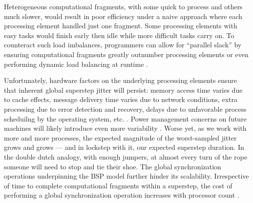 Heterogeneous computational fragments, with some quick to process and others much slower, would result in poor efficiency under a naive approach where each processing element handled just one fragment.
Some processing elements with easy tasks would finish early then idle while more difficult tasks carry on.
To counteract such load imbalances, programmers can allow for ``parallel slack'' by ensuring computational fragments greatly outnumber processing elements or even performing dynamic load balancing at runtime \citep{valiant1990bridging}.

Unfortunately, hardware factors on the underlying processing elements ensure that inherent global superstep jitter will persist: memory access time varies due to cache effects, message delivery time varies due to network conditions, extra processing due to error detection and recovery, delays due to unfavorable process scheduilng by the operating system, etc. \citep{dongarra2014applied}.
Power management concerns on future machines will likely introduce even more variability \citep{gropp2013programming}.
Worse yet, as we work with more and more processes, the expected magnitude of the worst-sampled jitter grows and grows --- and in lockstep with it, our expected superstep duration.
In the double dutch analogy, with enough jumpers, at almost every turn of the rope someone will need to stop and tie their shoe.
The global synchronization operations underpinning the BSP model further hinder its scalability.
Irrespective of time to complete computational fragments within a superstep, the cost of performing a global synchronization operation increases with processor count \citep{dongarra2014applied}.

